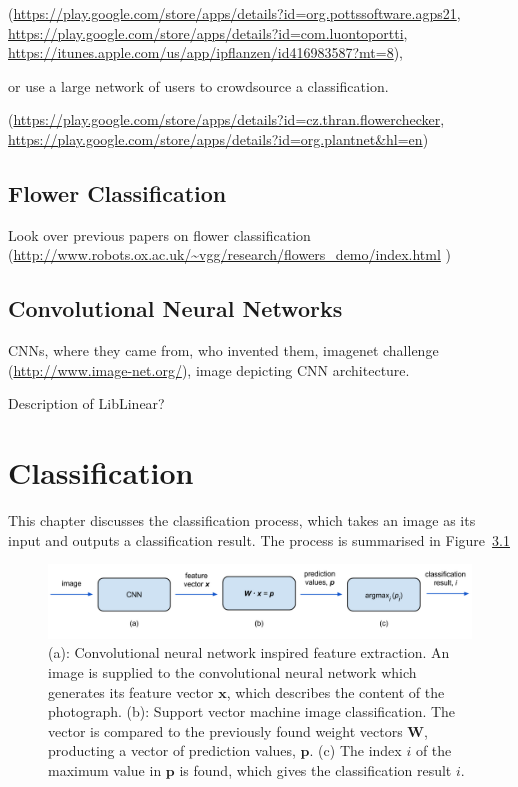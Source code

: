 \documentclass[11pt, a4paper]{report}
\newcommand{\vect}[1]{\boldsymbol{#1}}
\begin{document}
(\url{https://play.google.com/store/apps/details?id=org.pottssoftware.agps21}, 
\url{https://play.google.com/store/apps/details?id=com.luontoportti}, 
\url{https://itunes.apple.com/us/app/ipflanzen/id416983587?mt=8}), 

or use a large network of users to crowdsource a classification. 

(\url{https://play.google.com/store/apps/details?id=cz.thran.flowerchecker}, \url{https://play.google.com/store/apps/details?id=org.plantnet&hl=en})


\section{Flower Classification}

Look over previous papers on flower classification (\url{http://www.robots.ox.ac.uk/~vgg/research/flowers_demo/index.html}	)

\section{Convolutional Neural Networks}

CNNs, where they came from, who invented them, imagenet challenge (\url{http://www.image-net.org/}), image depicting CNN architecture. 


Description of LibLinear?












\chapter{Classification}

This chapter discusses the classification process, which takes an image as its input and outputs a classification result. The process is summarised in Figure~\ref{img:08}

\begin{figure}[hbt]
	\centering
  \includegraphics[totalheight=3cm]{img/08.png}
  \caption{(a): Convolutional neural network inspired feature extraction. An image is supplied to the convolutional neural network which generates its feature vector $\vect{x}$, which describes the content of the photograph. (b): Support vector machine image classification. The vector is compared to the previously found weight vectors $\vect{W}$, producting a vector of prediction values, $\vect{p}$. (c) The index $i$ of the maximum value in $\vect{p}$ is found, which gives the classification result $i$.}
  \label{img:08}
\end{figure}
\end{document}
